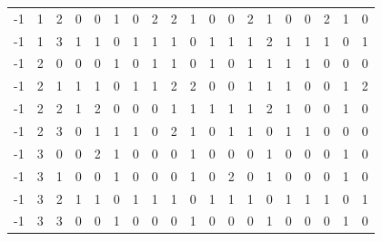 {\begin{longtable}{rrr|rrrr|rrrr|rrrr|rrrr}
-1&1&2&0&0&1&0&2&2&1&0&0&2&1&0&0&2&1&0\\
-1&1&3&1&1&0&1&1&1&0&1&1&1&2&1&1&1&0&1\\
-1&2&0&0&0&1&0&1&1&0&1&0&1&1&1&1&0&0&0\\
-1&2&1&1&1&0&1&1&2&2&0&0&1&1&1&0&0&1&2\\
-1&2&2&1&2&0&0&0&1&1&1&1&1&2&1&0&0&1&0\\
-1&2&3&0&1&1&1&0&2&1&0&1&1&0&1&1&0&0&0\\
-1&3&0&0&2&1&0&0&0&1&0&0&0&1&0&0&0&1&0\\
-1&3&1&0&0&1&0&0&0&1&0&2&0&1&0&0&0&1&0\\
-1&3&2&1&1&0&1&1&1&0&1&1&1&0&1&1&1&0&1\\
-1&3&3&0&0&1&0&0&0&1&0&0&0&1&0&0&0&1&0\\
\end{longtable}
}
